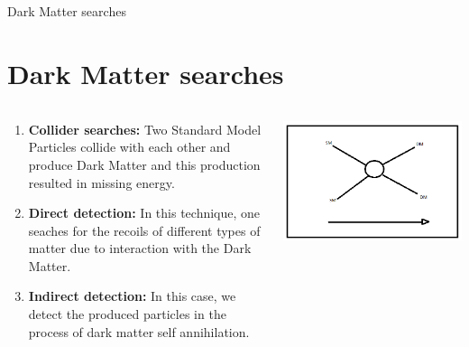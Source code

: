 \documentclass[11pt]{beamer}
\begin{document}
\begin{frame}[t]{Dark Matter searches}

\section{Dark Matter searches}
\begin{small}
\begin{columns}
\begin{column}{0.6\textwidth}
\begin{enumerate}

\item \textbf{Collider searches:} Two Standard Model Particles collide with each other and produce Dark Matter and this production resulted in missing energy.

\item \textbf{Direct detection:} In this technique, one seaches for the recoils of different types of matter due to interaction with the Dark Matter.

\item \textbf{Indirect detection:} In this case, we detect the produced particles in the process of dark matter self annihilation.

\end{enumerate}
\end{column}

\begin{column}{0.4\textwidth}
\includegraphics[scale=0.14]{collider_searches1.png}\\


\end{column}
\end{columns}
\end{small}
\end{frame}
\end{document}
